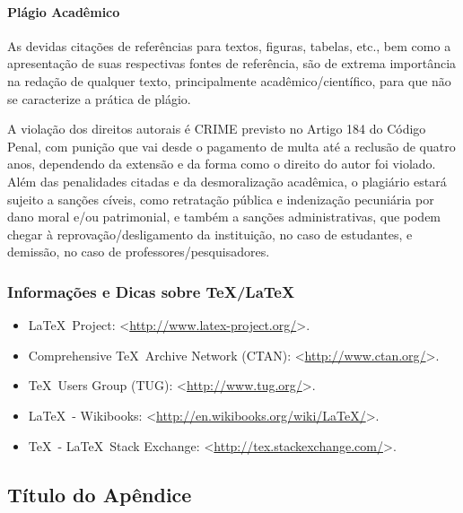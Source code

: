\documentclass[%
  article,%
  10pt,%
  a4paper,%
  fleqn,%
  oneside,%
  sumario = tradicional,%
  chapter = TITLE,%
  section = TITLE,%
]{abntex2}
\begin{document}
\subsubsection{Plágio Acadêmico}\label{sssec:plagio}

As devidas citações de referências para textos, figuras, tabelas, etc., bem como a apresentação de suas respectivas fontes de referência, são de extrema importância na redação de qualquer texto, principalmente acadêmico/científico, para que não se caracterize a prática de plágio.

A violação dos direitos autorais é CRIME previsto no Artigo 184 do Código Penal, com punição que vai desde o pagamento de multa até a reclusão de quatro anos, dependendo da extensão e da forma como o direito do autor foi violado. Além das penalidades citadas e da desmoralização acadêmica, o plagiário estará sujeito a sanções cíveis, como retratação pública e indenização pecuniária por dano moral e/ou patrimonial, e também a sanções administrativas, que podem chegar à reprovação/desligamento da instituição, no caso de estudantes, e demissão, no caso de professores/pesquisadores.

\subsection{Informações e Dicas sobre \TeX/\LaTeX}\label{ssec:texlatex}

\begin{itemize}
\item \LaTeX\ Project: <\url{http://www.latex-project.org/}>.
\item Comprehensive \TeX\ Archive Network (CTAN): <\url{http://www.ctan.org/}>.
\item \TeX\ Users Group (TUG): <\url{http://www.tug.org/}>.
\item \LaTeX\ - Wikibooks: <\url{http://en.wikibooks.org/wiki/LaTeX/}>.
\item \TeX\ - \LaTeX\ Stack Exchange: <\url{http://tex.stackexchange.com/}>.
\end{itemize}

\postextual%

\printbibliography%

\begin{ambienteapendices}%

\chapter{Título do Apêndice}\label{cap:apendicea}

\lipsum[11-15]

\end{ambienteapendices}
\end{document}
